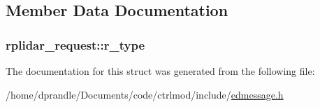 \subsection{Member Data Documentation}
\hypertarget{structrplidar__request_a11eebc40e0444f2a73765fbb08953fc4}{
\subsubsection[{r\-\_\-type}]{ rplidar\-\_\-request\-::r\-\_\-type}}\label{structrplidar__request_a11eebc40e0444f2a73765fbb08953fc4}


The documentation for this struct was generated from the following file\-:\begin{DoxyCompactItemize}
\item 
/home/dprandle/\-Documents/code/ctrlmod/include/\hyperlink{edmessage_8h}{edmessage.\-h}\end{DoxyCompactItemize}
